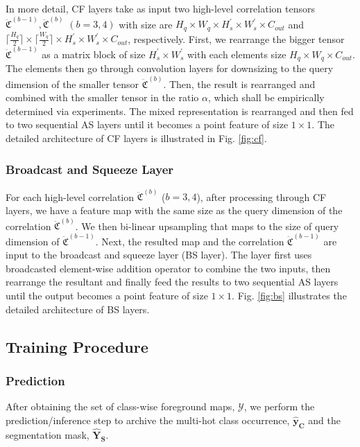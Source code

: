 \documentclass{ieeeaccess}
\begin{document}
In more detail, CF layers take as input two high-level correlation tensors $\mathbf{\ddot{\mathfrak{C}}}^{(b-1)}, \mathbf{\ddot{\mathfrak{C}}}^{(b)}$ $(b = 3,4)$ with size are $H_{q} \times W_{q} \times H^{'}_{s} \times W^{'}_{s} \times C_{out}$ and $\lceil \frac{H_{q}}{2} \rceil \times \lceil \frac{W_{q}}{2} \rceil \times H^{'}_{s} \times W^{'}_{s} \times C_{out}$,  respectively. First, we rearrange the bigger tensor $\mathbf{\ddot{\mathfrak{C}}}^{(b-1)}$ as a matrix block of size $H^{'}_{s} \times W^{'}_{s}$ with each elements size $H_{q} \times W_{q} \times C_{out}$. The elements then go through convolution layers for downsizing to the query dimension of the smaller tensor $\mathbf{\ddot{\mathfrak{C}}}^{(b)}$. Then, the result is rearranged and combined with the smaller tensor in the ratio $\alpha$, which shall be empirically determined via experiments. The mixed representation is rearranged and then fed to two sequential AS layers until it becomes a point feature of size $1 \times 1$. The detailed architecture of CF layers is illustrated in Fig. \ref{fig:cf}.

\subsubsection{Broadcast and Squeeze Layer}
\label{BSlayer}
For each high-level correlation $\mathbf{\ddot{\mathfrak{C}}}^{(b)}$ ($b=3,4$), after processing through CF layers, we have a feature map with the same size as the query dimension of the correlation $\mathbf{\ddot{\mathfrak{C}}}^{(b)}$. We then bi-linear upsampling that maps to the size of query dimension of $\mathbf{\ddot{\mathfrak{C}}}^{(b-1)}$. Next, the resulted map and the correlation $\mathbf{\ddot{\mathfrak{C}}}^{(b-1)}$ are input to the broadcast and squeeze layer (BS layer). The layer first uses broadcasted element-wise addition operator to combine the two inputs, then rearrange the resultant and finally feed the results to two sequential AS layers until the output becomes a point feature of size $1 \times 1$. Fig. \ref{fig:bs} illustrates the detailed architecture of BS layers.

\subsection{Training Procedure}
\subsubsection{Prediction}
After obtaining the set of class-wise foreground maps, $\mathcal{Y}$, we perform the prediction/inference step to archive the multi-hot class occurrence, $\hat{\mathbf{y}}_{\mathbf{C}}$ and the segmentation mask, $\hat{\mathbf{Y}}_{\mathbf{S}}$.
\end{document}
